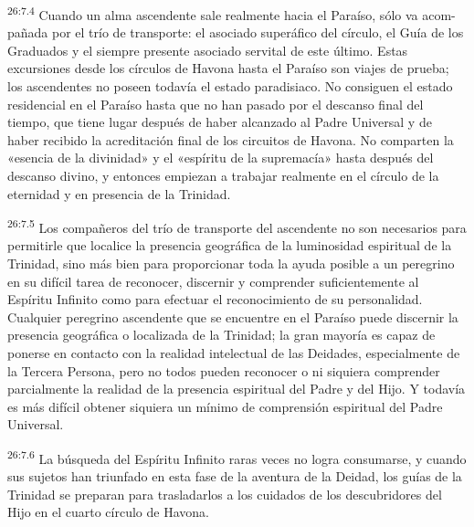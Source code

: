 \par
\textsuperscript{26:7.4} Cuando un alma ascendente sale realmente hacia el Paraíso, sólo va acom-pañada por el trío de transporte: el asociado superáfico del círculo, el Guía de los Graduados y el siempre presente asociado servital de este último. Estas excursiones desde los círculos de Havona hasta el Paraíso son viajes de prueba; los ascendentes no poseen todavía el estado paradisiaco. No consiguen el estado residencial en el Paraíso hasta que no han pasado por el descanso final del tiempo, que tiene lugar después de haber alcanzado al Padre Universal y de haber recibido la acreditación final de los circuitos de Havona. No comparten la «esencia de la divinidad» y el «espíritu de la supremacía» hasta después del descanso divino, y entonces empiezan a trabajar realmente en el círculo de la eternidad y en presencia de la Trinidad.

\par
\textsuperscript{26:7.5} Los compañeros del trío de transporte del ascendente no son necesarios para permitirle que localice la presencia geográfica de la luminosidad espiritual de la Trinidad, sino más bien para proporcionar toda la ayuda posible a un peregrino en su difícil tarea de reconocer, discernir y comprender suficientemente al Espíritu Infinito como para efectuar el reconocimiento de su personalidad. Cualquier peregrino ascendente que se encuentre en el Paraíso puede discernir la presencia geográfica o localizada de la Trinidad; la gran mayoría es capaz de ponerse en contacto con la realidad intelectual de las Deidades, especialmente de la Tercera Persona, pero no todos pueden reconocer o ni siquiera comprender parcialmente la realidad de la presencia espiritual del Padre y del Hijo. Y todavía es más difícil obtener siquiera un mínimo de comprensión espiritual del Padre Universal.

\par
\textsuperscript{26:7.6} La búsqueda del Espíritu Infinito raras veces no logra consumarse, y cuando sus sujetos han triunfado en esta fase de la aventura de la Deidad, los guías de la Trinidad se preparan para trasladarlos a los cuidados de los descubridores del Hijo en el cuarto círculo de Havona.

